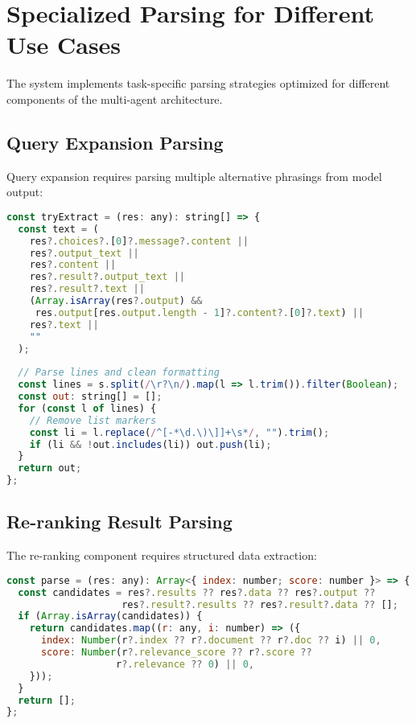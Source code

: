 \documentclass[11pt,a4paper]{article}
\begin{document}
\section{Specialized Parsing for Different Use Cases}

The system implements task-specific parsing strategies optimized for different components of the multi-agent architecture.

\subsection{Query Expansion Parsing}

Query expansion requires parsing multiple alternative phrasings from model output:

\begin{lstlisting}[language=JavaScript, caption=Query Expansion Parsing Logic]
const tryExtract = (res: any): string[] => {
  const text = (
    res?.choices?.[0]?.message?.content ||
    res?.output_text ||
    res?.content ||
    res?.result?.output_text ||
    res?.result?.text ||
    (Array.isArray(res?.output) && 
     res.output[res.output.length - 1]?.content?.[0]?.text) ||
    res?.text ||
    ""
  );
  
  // Parse lines and clean formatting
  const lines = s.split(/\r?\n/).map(l => l.trim()).filter(Boolean);
  const out: string[] = [];
  for (const l of lines) {
    // Remove list markers
    const li = l.replace(/^[-*\d.\)\]]+\s*/, "").trim(); 
    if (li && !out.includes(li)) out.push(li);
  }
  return out;
};
\end{lstlisting}

\subsection{Re-ranking Result Parsing}

The re-ranking component requires structured data extraction:

\begin{lstlisting}[language=JavaScript, caption=Re-ranking Result Parser]
const parse = (res: any): Array<{ index: number; score: number }> => {
  const candidates = res?.results ?? res?.data ?? res?.output ?? 
                    res?.result?.results ?? res?.result?.data ?? [];
  if (Array.isArray(candidates)) {
    return candidates.map((r: any, i: number) => ({
      index: Number(r?.index ?? r?.document ?? r?.doc ?? i) || 0,
      score: Number(r?.relevance_score ?? r?.score ?? 
                   r?.relevance ?? 0) || 0,
    }));
  }
  return [];
};
\end{lstlisting}
\end{document}
